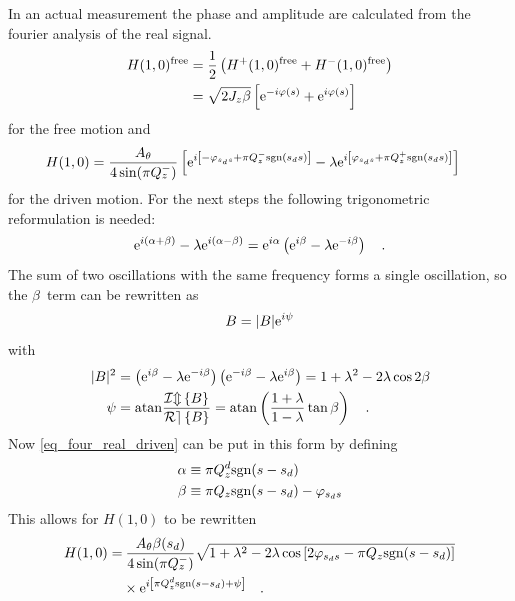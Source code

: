 In an actual measurement the phase and amplitude are calculated from the fourier analysis of the
real signal.
%
\begin{align}
   H(1,0)^\text{free} &= \frac{1}{2}\left( H^+(1,0)^\text{free} + H^-(1,0)^\text{free} \right)\notag \\
   &= \sqrt{2 J_z\beta} \left[ \text{e}^{-i\varphi(s) } + \text{e}^{i\varphi(s)} \right]
   \label{eq_four_real_free}
\end{align}
%
for the free motion and
%
\begin{align}
   H(1,0)
   &= \frac{A_\theta}{4\sin(\pi Q_z^-)}\left[
        \text{e}^{i\left[-\varphi_{s_ds} + \pi Q_z^-\text{sgn}(s_ds)\right]}
        -\lambda \text{e}^{i\left[\varphi_{s_ds} + \pi Q_z^+\text{sgn}(s_ds)\right]}
       \right]
       \label{eq_four_real_driven}
\end{align}
for the driven motion.
%
For the next steps the following trigonometric reformulation is needed:
%
\begin{equation}
  \text{e}^{i\left( \alpha + \beta \right)} - \lambda \text{e}^{i\left( \alpha - \beta \right)}
  = \text{e}^{i\alpha} \left(\text{e}^{i\beta} - \lambda\text{e}^{-i\beta}\right)
  \quad .
  \label{eq_e_alpha_lambda}
\end{equation}
%
The sum of two oscillations with the same frequency forms a single oscillation, so the $\beta$~term can
be rewritten as
%
\begin{equation}
  B = |B|\text{e}^{i\psi}
\end{equation}
with
%
\begin{align}
  |B|^2 &=  \left( \text{e}^{i\beta}-\lambda\text{e}^{-i\beta} \right)\left( \text{e}^{-i\beta} - \lambda\text{e}^{i\beta} \right)
  = 1+\lambda^2-2\lambda\cos{2\beta} \notag \\
  \psi&= \mathrm{atan} \frac{\mathcal{Im} \left\{ B \right\}}{\mathcal{Re} \left\{ B \right\}} = \mathrm{atan}\left(\frac{1+\lambda}{1-\lambda}\tan \beta\right)
  \quad .
\end{align}
%
Now \eqref{eq_four_real_driven} can be put in this form by defining
%
\begin{align}
  \alpha &\equiv \pi Q^{d}_{z} \text{sgn}(s-s_d) \notag \\
  \beta &\equiv \pi Q_z\text{sgn}(s-s_d) - \varphi_{s_ds}
\end{align}
%
This allows for $H(1,0)$ to be rewritten
%
\begin{align}
  H(1,0) =&\: \frac{A_\theta\beta(s_d)}{4\sin(\pi Q_z^-)}
  \sqrt{1+\lambda^2-2\lambda\cos\left[2\varphi_{s_ds} - \pi Q_z\text{sgn}(s-s_d)\right]} \notag \\
  &\times\text{e}^{i\left[ \pi Q^{d}_{z}\text{sgn}(s-s_d) + \psi \right]}
  \quad .
\end{align}
